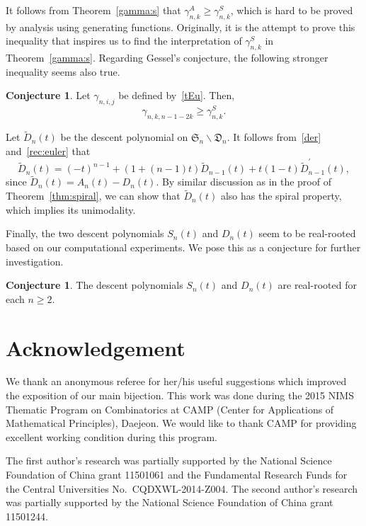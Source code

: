 \documentclass[12pt]{amsart}
\numberwithin{equation}{section}
\theoremstyle{plain}
\theoremstyle{definition}
\newtheorem{conjecture}[theorem]{Conjecture}
\def\S{\mathfrak{S}}
\def\D{\mathfrak{D}}
\begin{document}
 


 
It follows from Theorem~\ref{gamma:s} that 
$\gamma^A_{n,k}\geq  \gamma^S_{n,k}$,
which is hard to be proved by analysis using generating functions.
Originally, it is the attempt to prove this inequality that inspires us to find the interpretation of $\gamma^S_{n,k}$ in Theorem~\ref{gamma:s}. 
 Regarding Gessel's conjecture,  the following stronger inequality seems also true.

\begin{conjecture}
Let $\gamma_{n,i,j}$ be defined by~\eqref{tEu}. Then,
$$
\gamma_{n,k,n-1-2k}\geq \gamma^S_{n,k}.
$$
\end{conjecture}



Let $\widetilde{D}_n(t)$ be the descent polynomial on $\S_n\backslash\D_n$. It follows from~\eqref{der} and~\eqref{rec:euler} that 
 \begin{equation*}
\widetilde{D}_n(t)=(-t)^{n-1}+(1+(n-1)t)\widetilde{D}_{n-1}(t)+t(1-t)\widetilde{D}^{\prime}_{n-1}(t),
 \end{equation*}
since $\widetilde{D}_n(t)=A_n(t)-D_n(t)$. By similar discussion as in the proof of Theorem~\ref{thm:spiral}, we can show that $\widetilde{D}_n(t)$ also has the spiral property, which implies its unimodality.



Finally, the two descent polynomials $S_n(t)$ and $D_n(t)$ seem to be 
real-rooted based on our computational experiments. We pose this as a conjecture for further investigation.
\begin{conjecture} 
The descent polynomials $S_n(t)$ and $D_n(t)$ are real-rooted for each $n\geq2$.
\end{conjecture}
 

\section*{Acknowledgement} 

We thank an anonymous referee for her/his useful suggestions which improved the exposition of our main bijection.  This work was done during the 
2015 NIMS Thematic Program on Combinatorics 
at CAMP (Center for Applications of Mathematical Principles), Daejeon.
We  would like to thank CAMP for providing excellent working condition
during this program. 

The first author's research was partially supported by the National Science Foundation of China grant 11501061 and the Fundamental Research Funds for the Central Universities No.~CQDXWL-2014-Z004. The second author's research was partially supported by the National Science Foundation of China grant 11501244. 
\end{document}
